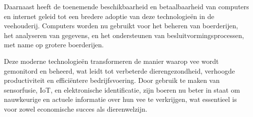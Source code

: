 Daarnaast heeft de toenemende beschikbaarheid en betaalbaarheid van computers en internet geleid tot een bredere adoptie van deze technologieën in de veehouderij. Computers worden nu gebruikt voor het beheren van boerderijen, het analyseren van gegevens, en het ondersteunen van besluitvormingsprocessen, met name op grotere boerderijen\autocite{IntechOpen}.

Deze moderne technologieën transformeren de manier waarop vee wordt gemonitord en beheerd, wat leidt tot verbeterde dierengezondheid, verhoogde productiviteit en efficiëntere bedrijfsvoering. Door gebruik te maken van sensorfusie, IoT, en elektronische identificatie, zijn boeren nu beter in staat om nauwkeurige en actuele informatie over hun vee te verkrijgen, wat essentieel is voor zowel economische succes als dierenwelzijn.


